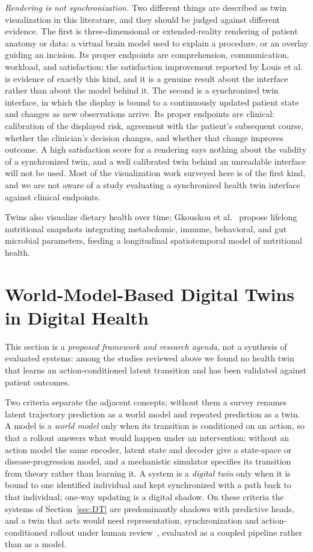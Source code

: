 \documentclass[journal]{IEEEtran}
\newif\ifsubmission
\begin{document}
\emph{Rendering is not synchronization.} Two different things are described as twin visualization in this literature, and they should be judged against different evidence. The first is three-dimensional or extended-reality rendering of patient anatomy or data: a virtual brain model used to explain a procedure, or an overlay guiding an incision. Its proper endpoints are comprehension, communication, workload, and satisfaction; the satisfaction improvement reported by Louis et al.~\cite{Louis2021VR} is evidence of exactly this kind, and it is a genuine result about the interface rather than about the model behind it. The second is a synchronized twin interface, in which the display is bound to a continuously updated patient state and changes as new observations arrive. Its proper endpoints are clinical: calibration of the displayed risk, agreement with the patient's subsequent course, whether the clinician's decision changes, and whether that change improves outcome. A high satisfaction score for a rendering says nothing about the validity of a synchronized twin, and a well calibrated twin behind an unreadable interface will not be used. Most of the visualization work surveyed here is of the first kind, and we are not aware of a study evaluating a synchronized health twin interface against clinical endpoints.

Twins also visualize dietary health over time; Gkouskou et al.~\cite{gkouskou2020virtual} propose lifelong nutritional snapshots integrating metabolomic, immune, behavioral, and gut microbial parameters, feeding a longitudinal spatiotemporal model of nutritional health.

\fi

\section{World-Model-Based Digital Twins in Digital Health}
\label{sec:world_model_dt}
\ifsubmission
This section is a \emph{proposed framework and research agenda}, not a synthesis of evaluated systems: among the studies reviewed above we found no health twin that learns an action-conditioned latent transition and has been validated against patient outcomes.

Two criteria separate the adjacent concepts; without them a survey renames latent trajectory prediction as a world model and repeated prediction as a twin. A model is a \emph{world model} only when its transition is conditioned on an action, so that a rollout answers what would happen under an intervention; without an action model the same encoder, latent state and decoder give a state-space or disease-progression model, and a mechanistic simulator specifies its transition from theory rather than learning it. A system is a \emph{digital twin} only when it is bound to one identified individual and kept synchronized with a path back to that individual; one-way updating is a digital shadow. On these criteria the systems of Section~\ref{sec:DT} are predominantly shadows with predictive heads, and a twin that acts would need representation, synchronization and action-conditioned rollout under human review~\cite{Sadee2025MedicalDT}, evaluated as a coupled pipeline rather than as a model.
\end{document}
